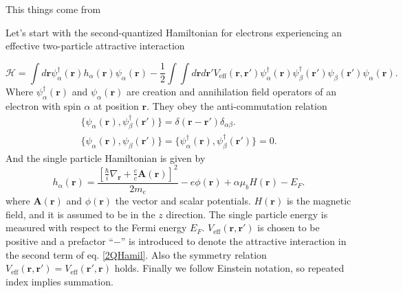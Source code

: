 This things come from \cite{Zhu2016}

Let's start with the second-quantized Hamiltonian for electrons experiencing an effective two-particle attractive interaction

\begin{equation}
    \mathscr{H} = \int d\bm{r} \psi_\alpha^\dagger(\bm{r})h_\alpha(\bm{r})\psi_\alpha(\bm{r}) - \frac{1}{2} \int \int d\bm{r}d\bm{r}'V_{\text{eff}}(\bm{r},\bm{r}')\psi_\alpha^\dagger(\bm{r})\psi_\beta^\dagger(\bm{r}')\psi_\beta(\bm{r}')\psi_\alpha(\bm{r}).
\end{equation}
Where $\psi_\alpha^\dagger(\bm{r})$ and $\psi_\alpha(\bm{r})$ are creation and annihilation field operators of an electron with spin $\alpha$ at position $\bm{r}$. They obey the anti-commutation relation
\begin{eqnarray}
    \{\psi_\alpha(\bm{r}),\psi_\beta^\dagger(\bm{r}')\} = \delta(\bm{r} - \bm{r}')\delta_{\alpha \beta}.\\
    \{\psi_\alpha(\bm{r}),\psi_\beta(\bm{r}')\} = \{\psi_\alpha^\dagger(\bm{r}),\psi_\beta^\dagger(\bm{r}')\} = 0.\label{2QHamil}
\end{eqnarray}
And the single particle Hamiltonian is given by
\begin{equation}
    h_\alpha(\bm{r}) = \frac{[\frac{\hbar}{i}\nabla_{\bm{r}} +\frac{e}{c}\bm{A}(\bm{r})]^2}{2m_e} -e\phi(\bm{r}) + \alpha\mu_bH(\bm{r}) - E_F.
\end{equation}
where $\bm{A}(\bm{r})$ and $\phi(\bm{r})$ the vector and scalar potentials. $H(\bm{r})$ is the magnetic field, and it is assumed to be in the $z$ direction. The single particle energy is measured with respect to the Fermi energy $E_F$. $V_{\text{eff}}(\bm{r},\bm{r}')$ is chosen to be positive and a prefactor ``$-$'' is introduced to denote the attractive interaction in the second term of eq. \ref{2QHamil}. Also the symmetry relation $V_{\text{eff}}(\bm{r},\bm{r}') = V_{\text{eff}}(\bm{r}',\bm{r})$ holds. Finally we follow Einstein notation, so repeated index implies summation.\\

